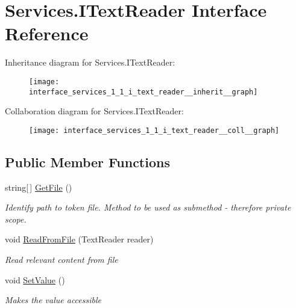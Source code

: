 \hypertarget{interface_services_1_1_i_text_reader}{}\section{Services.\+I\+Text\+Reader Interface Reference}
\label{interface_services_1_1_i_text_reader}


Inheritance diagram for Services.\+I\+Text\+Reader\+:
\nopagebreak
\begin{figure}[H]
\begin{center}
\leavevmode
\texttt{[image: interface\_services\_1\_1\_i\_text\_reader\_\_inherit\_\_graph]}
\end{center}
\end{figure}


Collaboration diagram for Services.\+I\+Text\+Reader\+:
\nopagebreak
\begin{figure}[H]
\begin{center}
\leavevmode
\texttt{[image: interface\_services\_1\_1\_i\_text\_reader\_\_coll\_\_graph]}
\end{center}
\end{figure}
\subsection*{Public Member Functions}
\begin{DoxyCompactItemize}
\item 
string\mbox{[}$\,$\mbox{]} \hyperlink{interface_services_1_1_i_text_reader_a729359f5178930c633a7d0480041638a}{Get\+File} ()
\begin{DoxyCompactList}\small\item\em Identify path to token file. Method to be used as submethod -\/ therefore private scope. \end{DoxyCompactList}\item 
void \hyperlink{interface_services_1_1_i_text_reader_ab635d59d4de79bf41ffe7a184473f416}{Read\+From\+File} (Text\+Reader reader)
\begin{DoxyCompactList}\small\item\em Read relevant content from file \end{DoxyCompactList}\item 
void \hyperlink{interface_services_1_1_i_text_reader_a670edc32225de1bcaf9942b4acc1edaf}{Set\+Value} ()
\begin{DoxyCompactList}\small\item\em Makes the value accessible \end{DoxyCompactList}\end{DoxyCompactItemize}


